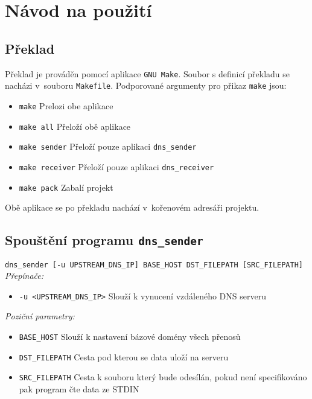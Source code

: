 \section{Návod na použití} \label{sec:usage}

\subsection{Překlad}\label{section:compilation}

Překlad je prováděn pomocí aplikace \texttt{GNU Make}.
Soubor s definicí překladu se nacházi v~souboru \texttt{Makefile}.
Podporované argumenty pro přikaz \texttt{make} jsou:

\begin{itemize}
    \item \texttt{make} Prelozi obe aplikace
    \item \texttt{make all} Přeloží obě aplikace
    \item \texttt{make sender} Přeloží pouze aplikaci \texttt{dns\_sender}
    \item \texttt{make receiver} Přeloží pouze aplikaci \texttt{dns\_receiver}
    \item \texttt{make pack} Zabalí projekt
\end{itemize}

Obě aplikace se po překladu nachází v~kořenovém adresáři projektu.

\subsection{Spouštění programu \texttt{dns\_sender}}

\texttt{dns\_sender [-u UPSTREAM\_DNS\_IP] {BASE\_HOST} {DST\_FILEPATH} [SRC\_FILEPATH]} \\

\textit{Přepínače:}

\begin{itemize}
    \item \texttt{-u <UPSTREAM\_DNS\_IP>} Slouží k vynucení vzdáleného DNS serveru
\end{itemize}

\textit{Poziční parametry:}

\begin{itemize}
    \item \texttt{BASE\_HOST} Slouží k nastavení bázové domény všech přenosů
    \item \texttt{DST\_FILEPATH} Cesta pod kterou se data uloží na serveru
    \item \texttt{SRC\_FILEPATH} Cesta k souboru který bude odesílán, pokud není specifikováno pak program čte data ze STDIN
\end{itemize}

